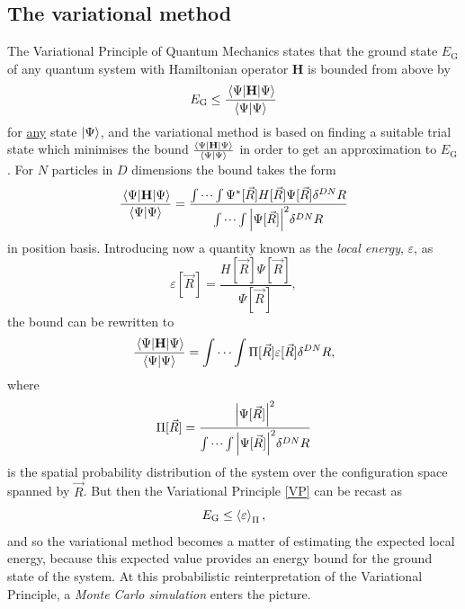 \documentclass[a4paper,8pt]{article}
\begin{document}
\begin{multicols}{2}
\subsection{The variational method} \label{varmethod}
The Variational Principle of Quantum Mechanics states that the ground state $E_\text{G}$ of any quantum system with Hamiltonian operator $\mathbf{H}$ is bounded from above by
\begin{equation}\label{VP}
E_\text{G} \leq \frac{\ev{\mathbf{H}}{\Psi}}{\braket{\Psi}{\Psi}}
\end{equation}
for \underline{any} state $\ket{\Psi}$, and the variational method is based on finding a suitable trial state which minimises the bound $\frac{\ev{\mathbf{H}}{\Psi}}{\braket{\Psi}{\Psi}}$ in order to get an approximation to $E_\text{G}$. For $N$ particles in $D$ dimensions the bound takes the form
\begin{align}
\frac{\ev{\mathbf{H}}{\Psi}}{\braket{\Psi}{\Psi}} = \frac{\idotsint \Psi^*[\vec{R}]H[\vec{R}]\Psi[\vec{R}]\delta^{DN}R}{\idotsint \abs{\Psi[\vec{R}]}^2\delta^{DN}R} \nonumber
\end{align}
in position basis. Introducing now a quantity known as the \textit{local energy}, $\varepsilon$, as
\begin{equation}\label{localenergy}
\varepsilon[\vec{R}] = \frac{H[\vec{R}]\Psi[\vec{R}]}{\Psi[\vec{R}]},
\end{equation}
the bound can be rewritten to
\begin{equation}
\frac{\ev{\mathbf{H}}{\Psi}}{\braket{\Psi}{\Psi}} = \idotsint \Pi[\vec{R}]\varepsilon[\vec{R}] \delta^{DN}R, \nonumber
\end{equation}
where
\begin{equation}\label{distribution}
\Pi[\vec{R}] = \frac{\abs{\Psi[\vec{R}]}^2}{\idotsint \abs{\Psi[\vec{R}]}^2\delta^{DN}R} 
\end{equation}
is the spatial probability distribution of the system over the configuration space spanned by $\vec{R}$. But then the Variational Principle \eqref{VP} can be recast as
\begin{equation}
E_\text{G} \leq \ev{\varepsilon}_\Pi,
\end{equation}
and so the variational method becomes a matter of estimating the expected local energy, because this expected value provides an energy bound for the ground state of the system. At this probabilistic reinterpretation of the Variational Principle, a \textit{Monte Carlo simulation} enters the picture.


\end{multicols}
\end{document}
